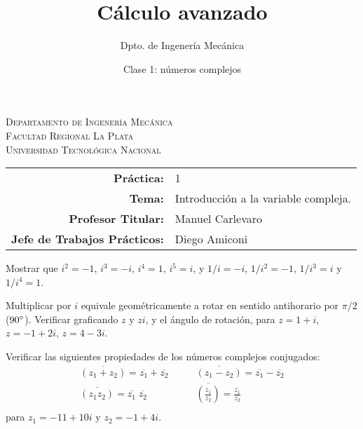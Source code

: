 \documentclass[11pt]{article}
\title{Cálculo avanzado}
\author{Dpto. de Ingenería Mecánica}
\date{Clase 1: números complejos}
\begin{document}

\begin{center}
\end{center} 

\begin{center}
\vspace{\baselineskip}
\Large{\textsc{Departamento de Ingenería Mecánica}} \\
\textsc{Facultad Regional La Plata} \\
\textsc{Universidad Tecnológica Nacional}
\end{center}


\begin{center}
\begin{tabular}{r l}
    \textbf{Práctica:} & 1 \\
 \textbf{Tema:} & Introducción a la variable compleja. \\
 \textbf{Profesor Titular:} & Manuel Carlevaro \\
 \textbf{Jefe de Trabajos Prácticos:} & Diego Amiconi \\
\end{tabular}\end{center}

\vspace{1em}

\begin{question} %
 Mostrar que $i^2 = -1$, $i^3 = -i$, $i^4 = 1$, $i^5 = i$, y $1/i = -i$, $1/i^2 = -1$, $1/i^3 = i$ y $1/i^4 = 1$.
\end{question}

\begin{question} %
 Multiplicar por $i$ equivale geométricamente a rotar en sentido antihorario por $\pi/2$ ($90\degree$). Verificar graficando $z$ y $zi$, y el ángulo de rotación, para $z = 1 + i$, $z = -1 + 2 i$, $z = 4 - 3 i$.
\end{question}

\begin{question} %
 Verificar las siguientes propiedades de los números complejos conjugados:
 \begin{align*}
  \overline{(z_1 + z_2)} = \overline{z_1} + \overline{z_2} &\qquad \overline{(z_1 - z_2)} = \overline{z_1} - \overline{z_2} \\
  \overline{(z_1 z_2)} = \overline{z_1} \; \overline{z_2} &\qquad \overline{ \left( \frac{z_1}{z_2} \right) } = \frac{\overline{z_1}}{\overline{z_2}} \\
 \end{align*}
 para $z_1 = -11 + 10 i$ y $z_2 = -1 + 4 i$.
\end{question}
\end{document}
